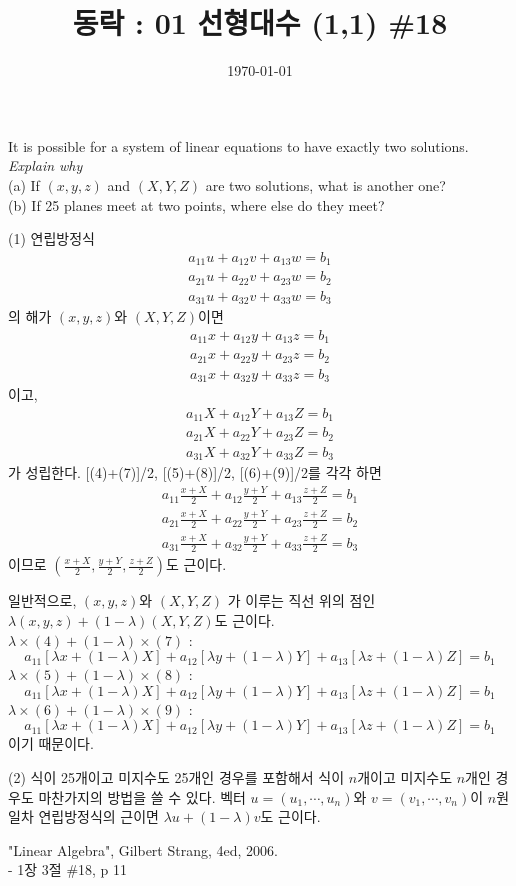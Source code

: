 \documentclass{article}
\begin{document}
\title{동락 : 01 선형대수 (1,1) \#18}
\author{}
\date{\today}
\maketitle

\noindent

\begin{mdframed}[frametitle={(1,3) \#18, p 11}]
It is possible for a system of linear equations to have exactly two solutions.
\textit{Explain why}
\\
(a) If \((x,y,z)\) and \((X,Y,Z)\) are two solutions, what is another one?\\
(b) If 25 planes meet at two points, where else do they meet?
\end{mdframed}

(1) 연립방정식
\begin{gather}
a_{11}u+a_{12}v+a_{13}w=b_1\\
a_{21}u+a_{22}v+a_{23}w=b_2\\
a_{31}u+a_{32}v+a_{33}w=b_3
\end{gather}
의 해가  \((x,y,z)\)와 \((X,Y,Z)\)이면
\begin{gather}
a_{11}x+a_{12}y+a_{13}z=b_1\\
a_{21}x+a_{22}y+a_{23}z=b_2\\
a_{31}x+a_{32}y+a_{33}z=b_3
\end{gather}
이고,
\begin{gather}
a_{11}X+a_{12}Y+a_{13}Z=b_1\\
a_{21}X+a_{22}Y+a_{23}Z=b_2\\
a_{31}X+a_{32}Y+a_{33}Z=b_3
\end{gather}
가 성립한다.
[(4)+(7)]/2, [(5)+(8)]/2, [(6)+(9)]/2를 각각 하면
\begin{gather}
a_{11}\frac{x+X}2+a_{12}\frac{y+Y}2+a_{13}\frac{z+Z}2=b_1\\
a_{21}\frac{x+X}2+a_{22}\frac{y+Y}2+a_{23}\frac{z+Z}2=b_2\\
a_{31}\frac{x+X}2+a_{32}\frac{y+Y}2+a_{33}\frac{z+Z}2=b_3
\end{gather}
이므로 \(\left(\frac{x+X}2,\frac{y+Y}2,\frac{z+Z}2\right)\)도 근이다.

일반적으로, \((x,y,z)\)와 \((X,Y,Z)\) 가 이루는 직선 위의 점인 \(\lambda(x,y,z)+(1-\lambda)(X,Y,Z)\)도 근이다.\\
\(\lambda\times(4)+(1-\lambda)\times(7)\) :
\[a_{11}[\lambda x+(1-\lambda)X]+a_{12}[\lambda y+(1-\lambda)Y]+a_{13}[\lambda z+(1-\lambda)Z]=b_1\]
\(\lambda\times(5)+(1-\lambda)\times(8)\) :
\[a_{11}[\lambda x+(1-\lambda)X]+a_{12}[\lambda y+(1-\lambda)Y]+a_{13}[\lambda z+(1-\lambda)Z]=b_1\]
\(\lambda\times(6)+(1-\lambda)\times(9)\) :
\[a_{11}[\lambda x+(1-\lambda)X]+a_{12}[\lambda y+(1-\lambda)Y]+a_{13}[\lambda z+(1-\lambda)Z]=b_1\]
이기 때문이다.

(2) 식이 25개이고 미지수도 25개인 경우를 포함해서 식이  \(n\)개이고 미지수도 \(n\)개인 경우도 마찬가지의 방법을 쓸 수 있다.
벡터 \(u=(u_1,\cdots,u_n)\)와 \(v=(v_1,\cdots,v_n)\)이 \(n\)원 일차 연립방정식의 근이면 \(\lambda u+(1-\lambda)v\)도 근이다.

\bigskip
\bigskip
\bigskip
\bigskip
\bigskip

"Linear Algebra", Gilbert Strang, 4ed, 2006.\\
- 1장 3절 \#18, p 11
\end{document}
